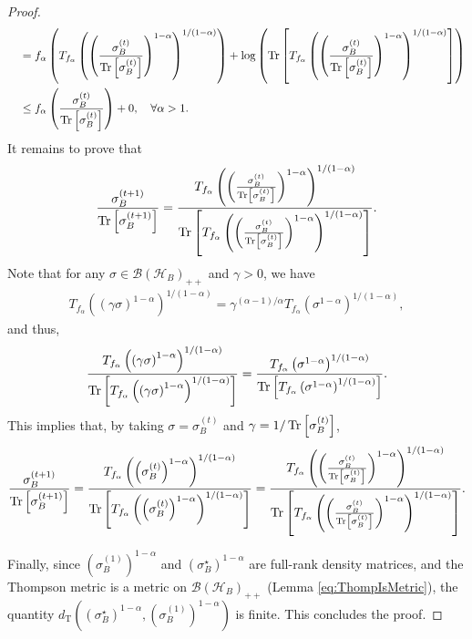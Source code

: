 \documentclass{article}
\begin{document}
\begin{proof}
\begin{align}
        &\quad=f_{\alpha}\left(T_{f_{\alpha}}\left(\left(\frac{\sigma_B^{(t)}}{\Tr\left[\sigma_B^{(t)}\right]}\right)^{1-\alpha}\right)^{1/(1-\alpha)}\right)+\log\left(\Tr\left[T_{f_{\alpha}}\left(\left(\frac{\sigma_B^{(t)}}{\Tr\left[\sigma_B^{(t)}\right]}\right)^{1-\alpha}\right)^{1/(1-\alpha)}\right]\right)\\
        &\quad\leq f_{\alpha}\left(\frac{\sigma_B^{(t)}}{\Tr\left[\sigma_B^{(t)}\right]}\right)+0,\quad\forall\alpha>1.
    \end{align}
    It remains to prove that
    \begin{align}
        \frac{\sigma_B^{(t+1)}}{\Tr\left[\sigma_B^{(t+1)}\right]}
        = \frac{T_{f_{\alpha}}\left(\left(\frac{\sigma_B^{(t)}}{\Tr\left[\sigma_B^{(t)}\right]}\right)^{1-\alpha}\right)^{1/(1-\alpha)}}{\Tr\left[T_{f_{\alpha}}\left(\left(\frac{\sigma_B^{(t)}}{\Tr\left[\sigma_B^{(t)}\right]}\right)^{1-\alpha}\right)^{1/(1-\alpha)}\right]}.
    \end{align}
    Note that for any $\sigma\in\mathcal{B}\left(\mathcal{H}_B\right)_{++}$ and $\gamma>0$, we have
    \begin{align}
        T_{f_{\alpha}}\left(\left(\gamma\sigma\right)^{1-\alpha}\right)^{1/(1-\alpha)}
        =\gamma^{(\alpha-1)/\alpha} T_{f_{\alpha}}\left(\sigma^{1-\alpha}\right)^{1/(1-\alpha)},
    \end{align}
    and thus,
    \begin{align}
        \frac{T_{f_{\alpha}}\left(\left(\gamma\sigma\right)^{1-\alpha}\right)^{1/(1-\alpha)}}{\Tr\left[T_{f_{\alpha}}\left(\left(\gamma\sigma\right)^{1-\alpha}\right)^{1/(1-\alpha)}\right]}
        =\frac{T_{f_{\alpha}}\left(\sigma^{1-\alpha}\right)^{1/(1-\alpha)}}{\Tr\left[T_{f_{\alpha}}\left(\sigma^{1-\alpha}\right)^{1/(1-\alpha)}\right]}.
    \end{align}
    This implies that, by taking $\sigma=\sigma_B^{(t)}$ and $\gamma=1/\Tr\left[\sigma_B^{(t)}\right]$,
    \begin{align}
        \frac{\sigma_B^{(t+1)}}{\Tr\left[\sigma_B^{(t+1)}\right]}
        =\frac{T_{f_{\alpha}}\left(\left(\sigma_B^{(t)}\right)^{1-\alpha}\right)^{1/(1-\alpha)}}{\Tr\left[T_{f_{\alpha}}\left(\left(\sigma_B^{(t)}\right)^{1-\alpha}\right)^{1/(1-\alpha)}\right]}
        = \frac{T_{f_{\alpha}}\left(\left(\frac{\sigma_B^{(t)}}{\Tr\left[\sigma_B^{(t)}\right]}\right)^{1-\alpha}\right)^{1/(1-\alpha)}}{\Tr\left[T_{f_{\alpha}}\left(\left(\frac{\sigma_B^{(t)}}{\Tr\left[\sigma_B^{(t)}\right]}\right)^{1-\alpha}\right)^{1/(1-\alpha)}\right]}.
    \end{align}
    
    Finally, since $\left(\sigma_B^{(1)}\right)^{1-\alpha}$ and $\left(\sigma_B^{\star}\right)^{1-\alpha}$ are full-rank density matrices, and the Thompson metric is a metric on $\mathcal{B}\left(\mathcal{H}_B\right)_{++}$ (Lemma \ref{eq:ThompIsMetric}), the quantity $d_{\mathrm{T}}\left(\left(\sigma_B^{\star}\right)^{1-\alpha},\left(\sigma_B^{(1)}\right)^{1-\alpha}\right)$ is finite. 
    This concludes the proof.
\end{proof}
\end{document}
